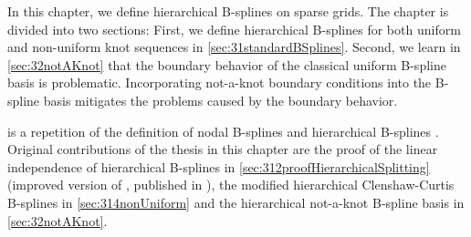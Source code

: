 In this chapter, we define hierarchical B-splines on sparse grids.
The chapter is divided into two sections:
First, we define hierarchical B-splines for both
uniform and non-uniform knot sequences in \cref{sec:31standardBSplines}.
Second, we learn in \cref{sec:32notAKnot} that the boundary behavior
of the classical uniform B-spline basis is problematic.
Incorporating not-a-knot boundary conditions into the B-spline basis
mitigates the problems caused by the boundary behavior.

 is a repetition of the definition
of nodal B-splines  and
hierarchical B-splines .
Original contributions of the thesis in this chapter are the proof of
the linear independence of hierarchical B-splines in
\cref{sec:312proofHierarchicalSplitting}
(improved version of \cite{Valentin14Hierarchische},
published in \cite{Valentin16Hierarchical}),
the modified hierarchical Clenshaw-Curtis B-splines in
\cref{sec:314nonUniform} and
the hierarchical not-a-knot B-spline basis in \cref{sec:32notAKnot}.






\cleardoublepage
